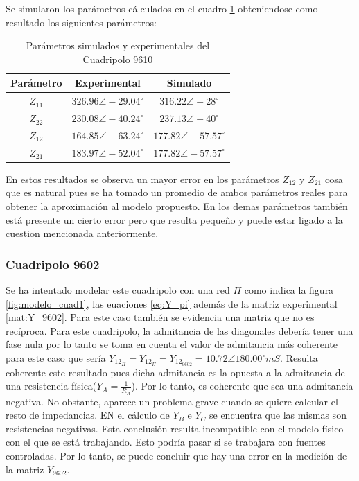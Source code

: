 Se simularon los parámetros cálculados en el cuadro \ref{tab:comp_9610} obteniendose como resultado los siguientes parámetros: 

\begin{table}[H]
    \centering
    \begin{tabular}{|c|c|c|}
        \hline
        Parámetro & Experimental & Simulado \\
        \hline
        $Z_{11}$ & $326.96 \angle -29.04^\circ$ & $316.22 \angle -28^\circ$ \\
        $Z_{22}$ &  $230.08 \angle -40.24^\circ$ &  $237.13 \angle -40^\circ$ \\
        $Z_{12}$ & $164.85 \angle -63.24^\circ$ & $177.82 \angle -57.57^\circ$ \\
        $Z_{21}$ & $183.97 \angle -52.04^\circ$ & $177.82 \angle -57.57^\circ$\\
        \hline
    \end{tabular}
    \caption{Parámetros simulados y experimentales del Cuadripolo 9610}
    \label{tab:comp_9610}
\end{table}
En estos resultados se observa un mayor error en los parámetros $Z_{12}$ y $Z_{21}$ cosa que es natural pues se ha tomado un promedio de ambos parámetros reales para obtener la aproximación al modelo propuesto. En los demas parámetros también está presente un cierto error pero que resulta pequeño y puede estar ligado a la cuestion mencionada anteriormente. 

\subsubsection{Cuadripolo 9602}
Se ha intentado modelar este cuadripolo con una red $\Pi$ como indica la figura \ref{fig:modelo_cuad1}, las euaciones \ref{eq:Y_pi} además de la matriz experimental \ref{mat:Y_9602}. Para este caso también se evidencia una matriz que no es recíproca. Para este cuadripolo, la admitancia de las diagonales debería tener una fase nula por lo tanto se toma en cuenta el valor de admitancia más coherente para este caso que sería $Y_{12_{\Pi}} = Y_{12_{\Pi}} = Y_{12_{9602}} = 10.72 \angle 180.00^\circ mS$. Resulta coherente este resultado pues dicha admitancia es la opuesta a la admitancia de una resistencia física($Y_A = \frac{1}{R_A}$). Por lo tanto, es coherente que sea una admitancia negativa. 
No obstante, aparece un problema grave cuando se quiere calcular el resto de impedancias. EN el cálculo de $Y_B$ e $Y_C$ se encuentra que las mismas son resistencias negativas. Esta conclusión resulta incompatible con el modelo físico con el que se está trabajando. Esto podría pasar si se trabajara con fuentes controladas. Por lo tanto, se puede concluir que hay una error en la medición de la matriz $Y_{9602}$. 










